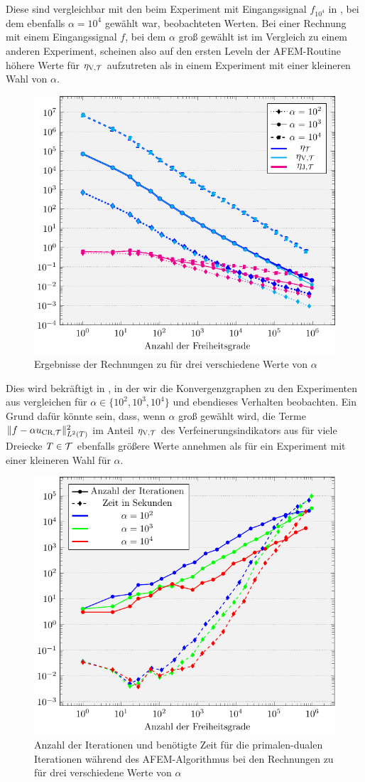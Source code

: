 Diese sind vergleichbar mit den beim Experiment mit Eingangssignal $f_{10^4}$
in , bei dem ebenfalls $\alpha=10^4$ gewählt
war, beobachteten Werten. 
Bei einer Rechnung mit einem Eingangssignal $f$, bei dem $\alpha$ groß gewählt
ist im Vergleich zu einem anderen Experiment, scheinen also auf den ersten
Leveln der AFEM-Routine höhere Werte für $\eta_{\textup{V}, \mathcal{T}}$ aufzutreten als in einem
Experiment mit einer kleineren Wahl von $\alpha$.
\begin{figure}[p]
  \centering
  \includegraphics[width=.8\linewidth]
    {pictures/chapExperiments/secGrayscale/denoise/conv.pdf}
  \caption{Ergebnisse der Rechnungen zu  für drei
    verschiedene Werte von $\alpha$}
  \label{fig:denoiseConvergence}
\end{figure}
Dies wird bekräftigt in , in der wir die
Konvergenzgraphen zu den Experimenten aus 
vergleichen für $\alpha\in\{10^2,10^3,10^4\}$ und ebendieses Verhalten
beobachten.
Ein Grund dafür könnte sein, dass, wenn $\alpha$ groß gewählt wird, die Terme
$\Vert f-\alpha u_{\textup{CR}, \mathcal{T}}\Vert^2_{L^2(T)}$ im Anteil $\eta_{\textup{V}, \mathcal{T}}$ des
Verfeinerungsindikators aus  für viele Dreiecke
$T\in\mathcal{T}$ ebenfalls größere Werte annehmen als für ein Experiment mit einer
kleineren Wahl für $\alpha$.
\begin{figure}[p]
  \centering
  \includegraphics[width=.5\linewidth]
    {pictures/chapExperiments/secConclusion/nrIterComp/grayscale/misc.pdf}
  \caption{Anzahl der Iterationen und benötigte Zeit für die primalen-dualen
    Iterationen während des AFEM-Algorithmus bei den Rechnungen zu
     für drei verschiedene Werte von $\alpha$}  
  \label{fig:denoiseNrIterComparison}
\end{figure}
